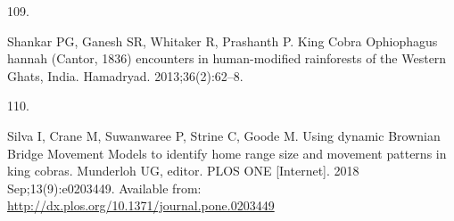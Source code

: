 \documentclass[10pt,a4paper]{article}
\newlength{\cslhangindent}
\newlength{\csllabelwidth}
\newlength{\cslentryspacingunit} %
\newenvironment{CSLReferences}[2] %
 {%
  \setlength{\parindent}{0pt}
  \ifodd #1
  \let\oldpar\par
  \def\par{\hangindent=\cslhangindent\oldpar}
  \fi
  \setlength{\parskip}{#2\cslentryspacingunit}
 }%
 {}
\newcommand{\CSLLeftMargin}[1]{\parbox[t]{\csllabelwidth}{#1}}
\newcommand{\CSLRightInline}[1]{\parbox[t]{\linewidth - \csllabelwidth}{#1}\break}
\begin{document}
\begin{CSLReferences}{0}{0}
\leavevmode\hypertarget{ref-Shankar2013}{}%
\CSLLeftMargin{109. }
\CSLRightInline{Shankar PG, Ganesh SR, Whitaker R, Prashanth P. King {Cobra} {Ophiophagus} hannah ({Cantor}, 1836) encounters in human-modified rainforests of the {Western} {Ghats}, {India}. Hamadryad. 2013;36(2):62--8. }

\leavevmode\hypertarget{ref-Silva2018}{}%
\CSLLeftMargin{110. }
\CSLRightInline{Silva I, Crane M, Suwanwaree P, Strine C, Goode M. Using dynamic {Brownian} {Bridge} {Movement} {Models} to identify home range size and movement patterns in king cobras. Munderloh UG, editor. PLOS ONE {[}Internet{]}. 2018 Sep;13(9):e0203449. Available from: \url{http://dx.plos.org/10.1371/journal.pone.0203449}}

\end{CSLReferences}
\end{document}
